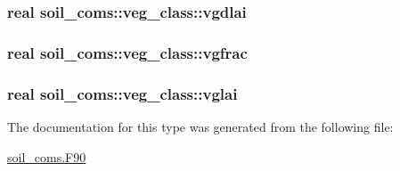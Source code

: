 \subsubsection[{\texorpdfstring{vgdlai}{vgdlai}}]{\setlength{\rightskip}{0pt plus 5cm}real soil\+\_\+coms\+::veg\+\_\+class\+::vgdlai}\hypertarget{structsoil__coms_1_1veg__class_abb7597f50b6c8385af74302a006f8adc}{}\label{structsoil__coms_1_1veg__class_abb7597f50b6c8385af74302a006f8adc}
\subsubsection[{\texorpdfstring{vgfrac}{vgfrac}}]{\setlength{\rightskip}{0pt plus 5cm}real soil\+\_\+coms\+::veg\+\_\+class\+::vgfrac}\hypertarget{structsoil__coms_1_1veg__class_a9b7ae82034658e541d67b317ae16113b}{}\label{structsoil__coms_1_1veg__class_a9b7ae82034658e541d67b317ae16113b}
\subsubsection[{\texorpdfstring{vglai}{vglai}}]{\setlength{\rightskip}{0pt plus 5cm}real soil\+\_\+coms\+::veg\+\_\+class\+::vglai}\hypertarget{structsoil__coms_1_1veg__class_a58b0bcf4172f42506d04a7253716218d}{}\label{structsoil__coms_1_1veg__class_a58b0bcf4172f42506d04a7253716218d}


The documentation for this type was generated from the following file\+:\begin{DoxyCompactItemize}
\item 
\hyperlink{soil__coms_8_f90}{soil\+\_\+coms.\+F90}\end{DoxyCompactItemize}

